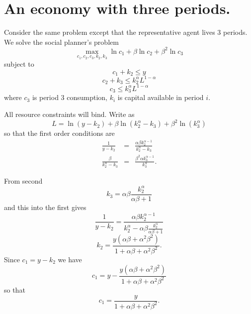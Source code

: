 \documentclass{sebase}
\begin{document}
\pagebreak

\section{An economy with three periods.}

Consider the same problem except that the representative agent lives 3
periods. We solve the social planner's problem%
\begin{equation*}
\underset{c_{1},c_{2},c_{3},k_{2},k_{3}}{\max }\ln c_{1}+\beta \ln
c_{2}+\beta ^{2}\ln c_{3}
\end{equation*}%
subject to%
\begin{equation*}
c_{1}+k_{2}\leq y
\end{equation*}%
\begin{equation*}
c_{2}+k_{3}\leq k_{2}^{\alpha }L^{1-\alpha }
\end{equation*}%
\begin{equation*}
c_{3}\leq k_{3}^{\alpha }L^{1-\alpha }
\end{equation*}%
where $c_{3}$ is period 3 consumption, $k_{i}$ is capital available in
period $i$.

\pagebreak

All resource constraints will bind. Write as 
\begin{equation*}
L=\ln \left( y-k_{2}\right) +\beta \ln \left( k_{2}^{\alpha }-k_{3}\right)
+\beta ^{2}\ln \left( k_{3}^{\alpha }\right)
\end{equation*}%
so that the first order conditions are%
\begin{eqnarray*}
\frac{1}{y-k_{2}} &=&\frac{\alpha \beta k_{2}^{\alpha -1}}{k_{2}^{\alpha
}-k_{3}} \\
\frac{\beta }{k_{2}^{\alpha }-k_{3}} &=&\frac{\beta ^{2}\alpha k_{3}^{\alpha
-1}}{k_{3}^{\alpha }}.
\end{eqnarray*}%
\pagebreak

From second 
\begin{equation*}
k_{3}=\alpha \beta \frac{k_{2}^{\alpha }}{\alpha \beta +1}
\end{equation*}%
and this into the first gives 
\begin{equation*}
\frac{1}{y-k_{2}}=\frac{\alpha \beta k_{2}^{\alpha -1}}{k_{2}^{\alpha
}-\alpha \beta \frac{k_{2}^{\alpha }}{\alpha \beta +1}}
\end{equation*}%
\begin{equation*}
k_{2}=\frac{y\left( \alpha \beta +\alpha ^{2}\beta ^{2}\right) }{1+\alpha
\beta +\alpha ^{2}\beta ^{2}}.
\end{equation*}%
Since $c_{1}=y-k_{2}$ we have%
\begin{equation*}
c_{1}=y-\frac{y\left( \alpha \beta +\alpha ^{2}\beta ^{2}\right) }{1+\alpha
\beta +\alpha ^{2}\beta ^{2}}
\end{equation*}%
so that 
\begin{equation*}
c_{1}=\frac{y}{1+\alpha \beta +\alpha ^{2}\beta ^{2}}.
\end{equation*}%
\pagebreak
\end{document}
